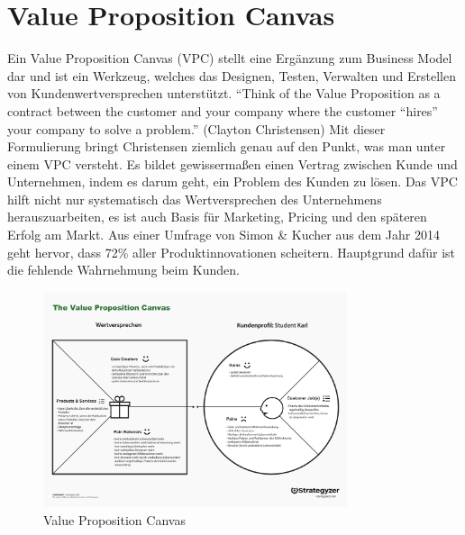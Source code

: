 \section{Value Proposition Canvas}
Ein Value Proposition Canvas (VPC) stellt eine Ergänzung zum Business Model dar und ist ein Werkzeug, welches das Designen, Testen, Verwalten und Erstellen von Kundenwertversprechen unterstützt. \enquote{Think of the Value Proposition as a contract between the customer and your company where the customer “hires” your company to solve a problem.} (Clayton Christensen) Mit dieser Formulierung bringt Christensen ziemlich genau auf den Punkt, was man unter einem VPC versteht. Es bildet gewissermaßen einen Vertrag zwischen Kunde und Unternehmen, indem es darum geht, ein Problem des Kunden zu lösen. Das VPC hilft nicht nur systematisch das Wertversprechen des Unternehmens herauszuarbeiten, es ist auch Basis für Marketing, Pricing und den späteren Erfolg am Markt. Aus einer Umfrage von Simon \& Kucher aus dem Jahr 2014 geht hervor, dass 72\% aller Produktinnovationen scheitern. Hauptgrund dafür ist die fehlende Wahrnehmung beim Kunden.\autocite[vgl.][]{Simon&Kucher.2014}\\
\begin{figure}[htbp] 
	\centering
	\includegraphics[width=0.8\textwidth]{img/VPC.pdf}
	\caption{Value Proposition Canvas}
	\label{fig:vpc}
\end{figure}

